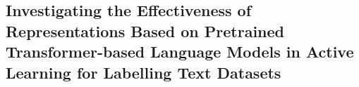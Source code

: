 \subsection{Investigating the Effectiveness of Representations Based on Pretrained Transformer-based Language Models in Active Learning for Labelling Text Datasets}
\label{investigating-effectiveness}
